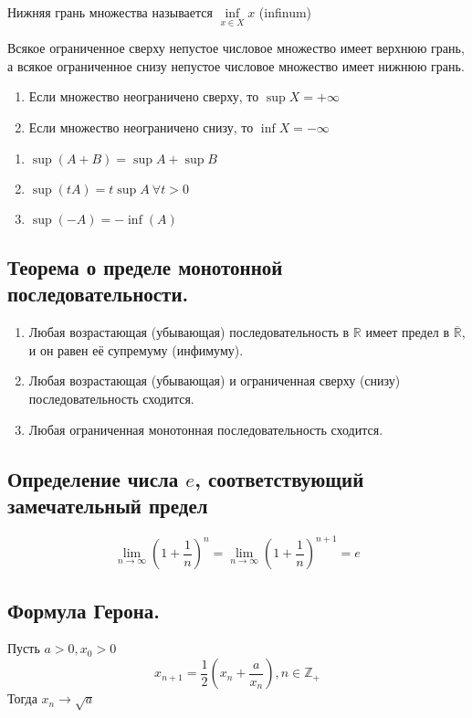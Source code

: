 \documentclass{article}
\begin{document}
 Нижняя грань множества называется $\inf\limits_{x \in X}x$ (infinum)

 Всякое ограниченное сверху непустое числовое множество имеет верхнюю грань, а всякое ограниченное снизу непустое числовое множество имеет нижнюю грань.

\begin{enumerate}
	\item Если множество неограничено сверху, то $\sup X = +\infty$
	\item Если множество неограничено снизу, то $\inf X = -\infty$
\end{enumerate}

\begin{enumerate}
	\item $\sup(A + B) = \sup A + \sup B$
	\item $\sup(tA) = t\sup A\ \forall t > 0$
	\item $\sup(-A) = -\inf(A)$
\end{enumerate}

\subsection{Теорема о пределе монотонной последовательности.}
\begin{enumerate}
	\item Любая возрастающая (убывающая) последовательность в $\mathbb{R}$ имеет предел в $\overline{\mathbb{R}}$, и он равен её супремуму (инфимуму).
	\item Любая возрастающая (убывающая) и ограниченная сверху (снизу) последовательность сходится.
	\item Любая ограниченная монотонная последовательность сходится.
\end{enumerate}

\subsection{\bf Определение числа $e$, соответствующий замечательный предел}
\begin{equation*}
	\lim\limits_{n \to \infty}(1 + \frac{1}{n})^n = \lim\limits_{n \to \infty}(1 + \frac{1}{n})^{n + 1} = e
\end{equation*}

\subsection{Формула Герона.}
 Пусть $a > 0, x_0 > 0$
\begin{equation*}
	x_{n+1} = \frac{1}{2}(x_n + \frac{a}{x_n}), n \in \mathbb{Z}_+
\end{equation*}
Тогда $x_n \to \sqrt{a}$
\end{document}
